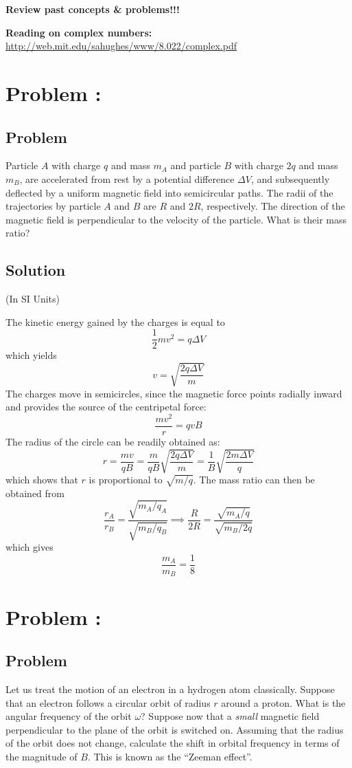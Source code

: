 \documentclass[solutions]{esg8022pset}
\date{\today }
\begin{document}
  \noindent \textbf{Review past concepts \& problems!!!}

  \noindent \textbf{Reading on complex numbers:} \url{http://web.mit.edu/sahughes/www/8.022/complex.pdf}
\section{Problem \thesection: }
\subsection{Problem}
  Particle $A$ with charge $q$ and mass $m_A$ and particle $B$ with charge $2q$ and mass $m_B$, are accelerated from rest by a potential difference $\Delta V$, and subsequently deflected by a uniform magnetic field into semicircular paths. The radii of the trajectories by particle $A$ and $B$ are $R$ and $2R$, respectively. The direction of the magnetic field is perpendicular to the velocity of the particle. What is their mass ratio?
\subsection{Solution}
  (In SI Units)

  The kinetic energy gained by the charges is equal to
  $$\frac12 mv^2 = q\Delta V$$
  which yields
  $$v = \sqrt{\frac{2q \Delta V}{m}}$$
  The charges move in semicircles, since the magnetic force points radially inward and provides the source of the centripetal force:
  $$\frac{mv^2}{r} = qvB$$
  The radius of the circle can be readily obtained as:
  $$r = \frac{mv}{qB} = \frac{m}{qB}\sqrt{\frac{2q\Delta V}{m}} = \frac{1}{B}\sqrt{\frac{2m\Delta V}{q}}$$
  which shows that $r$ is proportional to $\sqrt{m/q}$. The mass ratio can then be obtained from
  $$\frac{r_A}{r_B} = \frac{\sqrt{m_A / q_A}}{\sqrt{m_B / q_B}} \implies \frac{R}{2R} = \frac{\sqrt{m_A / q}}{\sqrt{m_B / 2q}}$$
  which gives
  $$\frac{m_A}{m_B} = \frac18$$
\section{Problem \thesection: }
\subsection{Problem}
  Let us treat the motion of an electron in a hydrogen atom classically. Suppose that an electron follows a circular orbit of radius $r$ around a proton. What is the angular frequency of the orbit $\omega$? Suppose now that a \emph{small} magnetic field perpendicular to the plane of the orbit is switched on. Assuming that the radius of the orbit does not change, calculate the shift in orbital frequency in terms of the magnitude of $B$. This is known as the ``Zeeman effect''.
\end{document}
